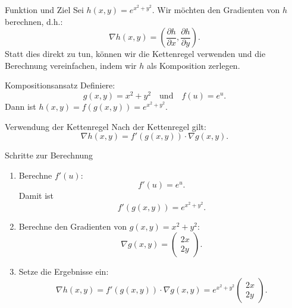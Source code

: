 \documentclass{beamer}
\begin{document}
    \begin{frame}
        \begin{block}{Funktion und Ziel}
            Sei \( h(x, y) = e^{x^2 + y^2} \). Wir möchten den Gradienten von \( h \) berechnen, d.h.:
            \[
            \nabla h(x, y) = \left( \frac{\partial h}{\partial x}, \frac{\partial h}{\partial y} \right).
            \]
            Statt dies direkt zu tun, können wir die Kettenregel verwenden und die Berechnung vereinfachen, indem wir \( h \) als Komposition zerlegen.
        \end{block}
    \end{frame}
    
    \begin{frame}
        \begin{block}{Kompositionsansatz}
            Definiere:
            \[
            g(x, y) = x^2 + y^2 \quad \text{und} \quad f(u) = e^u.
            \]
            Dann ist \( h(x, y) = f(g(x, y)) = e^{x^2 + y^2} \).
        \end{block}
        
        \begin{block}{Verwendung der Kettenregel}
            Nach der Kettenregel gilt:
            \[
            \nabla h(x, y) = f'(g(x, y)) \cdot \nabla g(x, y).
            \]
        \end{block}
    \end{frame}
    
    \begin{frame}
        \begin{block}{Schritte zur Berechnung}
            \begin{enumerate}
                \item Berechne \( f'(u) \):
                \[
                f'(u) = e^u.
                \]
                Damit ist
                \[
                f'(g(x, y)) = e^{x^2 + y^2}.
                \]
                
                \item Berechne den Gradienten von \( g(x, y) = x^2 + y^2 \):
                \[
                \nabla g(x, y) = \begin{pmatrix} 2x \\ 2y \end{pmatrix}.
                \]
                
                \item Setze die Ergebnisse ein:
                \[
                \nabla h(x, y) = f'(g(x, y)) \cdot \nabla g(x, y) = e^{x^2 + y^2} \begin{pmatrix} 2x \\ 2y \end{pmatrix}.
                \]
            \end{enumerate}
        \end{block}
    \end{frame}
    
\end{document}
